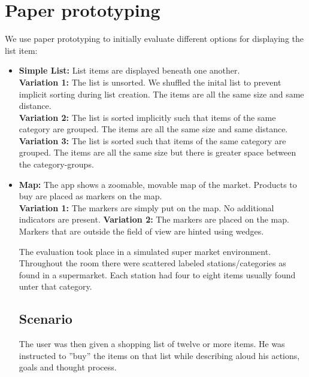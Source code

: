 \documentclass{article}
\begin{document}
\section{Paper prototyping}
We use paper prototyping to initially evaluate different options for displaying the list item:

\label{sec:list-types}
\begin{itemize}
    \item \textbf{Simple List:} List items are displayed beneath one another.\\
        \textbf{Variation 1:} The list is unsorted. We shuffled the inital list to prevent implicit sorting during list creation.
            The items are all the same size and same distance. \\
        \textbf{Variation 2:} The list is sorted implicitly such that items of the same category are grouped.
            The items are all the same size and same distance. \\
        \textbf{Variation 3:} The list is sorted such that items of the same category are grouped.
            The items are all the same size but there is greater space between the category-groups.
    \item \textbf{Map:} The app shows a zoomable, movable map of the market. Products to buy are placed as markers on the map. \\
        \textbf{Variation 1:} The markers are simply put on the map. No additional indicators are present.
        \textbf{Variation 2:} The markers are placed on the map. Markers that are outside the field of view are hinted using wedges. \cite{TODO}
\begin{itemize}


The evaluation took place in a simulated super market environment. 
Throughout the room there were scattered labeled stations/categories as found in a supermarket.
Each station had four to eight items usually found unter that category.

\subsection{Scenario}
The user was then given a shopping list of twelve or more items. 
He was instructed to ''buy'' the items on that list while describing aloud his actions, goals and thought process.


\end{itemize}
\end{itemize}
\end{document}
